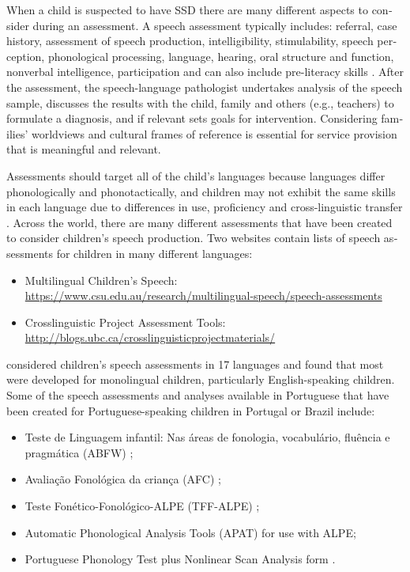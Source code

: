 \documentclass[output=paper,colorlinks,citecolor=brown]{langscibook}
\begin{document}
\begin{otherlanguage}{english}
When a child is suspected to have SSD there are many different aspects to consider during an assessment. A speech assessment typically includes: referral, case history, assessment of speech production, intelligibility, stimulability, speech perception, phonological processing, language, hearing, oral structure and function, nonverbal intelligence, participation and can also include pre-literacy skills \citep{McLeodEtAl2017}. After the assessment, the speech-language pathologist undertakes analysis of the speech sample, discusses the results with the child, family and others (e.g., teachers) to formulate a diagnosis, and if relevant sets goals for intervention. Considering families’ worldviews and cultural frames of reference is essential for service provision that is meaningful and relevant.

Assessments should target all of the child’s languages because languages differ phonologically and phonotactically, and children may not exhibit the same skills in each language due to differences in use, proficiency and cross-linguistic transfer \citep{McLeodEtAl2017}. Across the world, there are many different assessments that have been created to consider children’s speech production. Two websites contain lists of speech assessments for children in many different languages:

\begin{itemize}
    \item Multilingual Children’s Speech: \\
    \url{https://www.csu.edu.au/research/multilingual-speech/speech-assessments}
\item	Crosslinguistic Project Assessment Tools:
\\
\url{http://blogs.ubc.ca/crosslinguisticprojectmaterials/}
\end{itemize}

\citet{McLeod2014} considered children’s speech assessments in 17 languages and found that most were developed for monolingual children, particularly English-speaking children. Some of the speech assessments and analyses available in Portuguese that have been created for Portuguese-speaking children in Portugal or Brazil include:

\begin{itemize}
    \item Teste de Linguagem infantil: Nas áreas de fonologia, vocabulário, fluência e pragmática (ABFW) \citep{Andrade2000};
    \item	Avaliação Fonológica da criança (AFC) \citep{Yavas1991a};
\item	Teste Fonético-Fonológico-ALPE (TFF-ALPE) \citep{Mendes2009}; 
\item	Automatic Phonological Analysis Tools (APAT) \citep{Saraiva2017} for use with ALPE;
\item	Portuguese Phonology Test plus Nonlinear Scan Analysis form \citep{Bunney2012}.
\end{itemize}



\end{otherlanguage}
\end{document}
